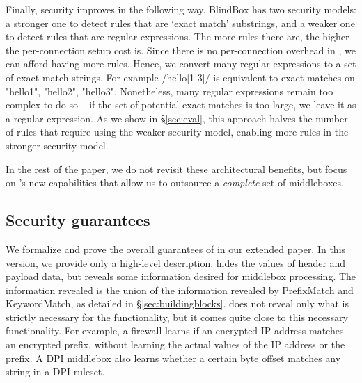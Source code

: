 Finally, security improves in the following way.
BlindBox has two security models: a stronger one to detect rules that are `exact match' substrings, and a weaker one to detect rules that are regular expressions. The more rules there are, the higher the per-connection setup cost is. 
Since there is no per-connection overhead  in \sys, we can afford having more rules. 
Hence, we convert many regular expressions to a set of exact-match strings. 
For example /hello[1-3]/ is equivalent to exact matches on "hello1", "hello2", "hello3".
Nonetheless, many regular expressions remain too complex to do so -- if the set of potential exact matches is too large, we leave it as a regular expression.
As we show in \S\ref{sec:eval}, this approach halves the number of rules that require using the weaker security model, enabling more rules in the stronger security model. 

In the rest of the paper, we do not revisit these architectural benefits, but focus  on \sys's new capabilities that allow us to outsource a {\it complete} set of middleboxes.

\subsection{Security guarantees}

We formalize and prove the overall guarantees of \sys in our extended paper. In this version, we provide only  a high-level description. 
\sys hides the values of header and payload data, but reveals some information desired for middlebox processing. The information revealed is the union of the information revealed by PrefixMatch and KeywordMatch, as detailed in \S\ref{sec:buildingblocks}. \sys does not reveal only what is strictly necessary for the functionality, but it comes quite close to this necessary functionality.  For example, a firewall learns if an encrypted IP address matches an encrypted prefix, without learning the actual values of the IP address or the prefix. A DPI middlebox also learns whether a certain byte offset matches any string in a DPI ruleset. 


